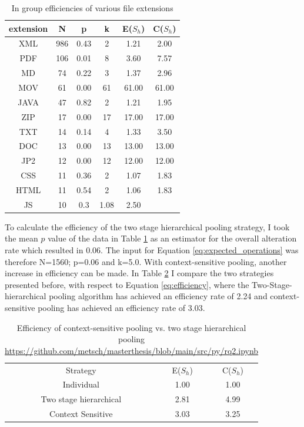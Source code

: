 \begin{table}[b]
    \caption{In group efficiencies of various file extensions}
    \centering
    \begin{tabular}{ c c c c c c}
    \label{tb:efficiency}
     extension & N & p & k & E($S_h$) & C($S_h$) \\
     \hline
     XML & 986 & 0.43 & 2 & 1.21  & 2.00 \\  
     \hline
     PDF &106 &0.01 & 8 &  3.60 & 7.57 \\
     \hline
     MD & 74 & 0.22  & 3 & 1.37 & 2.96 \\    
     \hline
     MOV&61 & 0.00 &  61 & 61.00 & 61.00 \\  
     \hline
     JAVA &47 &0.82 & 2  & 1.21 & 1.95 \\  
     \hline
     ZIP & 17 &0.00 &  17 & 17.00 & 17.00 \\
     \hline
     TXT & 14 & 0.14 &  4 & 1.33 & 3.50 \\ 
     \hline
     DOC & 13 & 0.00 &  13 & 13.00 & 13.00 \\   
     \hline
     JP2 & 12 & 0.00 &  12 & 12.00 & 12.00 \\   
     \hline
     CSS & 11 & 0.36 & 2  & 1.07 & 1.83 \\  
     \hline
     HTML & 11 & 0.54 &  2 & 1.06 & 1.83 \\   
     \hline
     JS & 10 & 0.3 & 1.08 & 2.50 
    \end{tabular}
\end{table}

To calculate the efficiency of the two stage hierarchical pooling strategy, I took the mean $p$ value of the data in Table \ref{tb:efficiency} as an estimator for the overall alteration rate which resulted in 0.06. The input for Equation \ref{eq:expected_operations} was therefore N=1560; p=0.06 and k=5.0.
With context-sensitive pooling, another increase in efficiency can be made. In Table \ref{tb:context-sensitive} I compare the two strategies presented before, with respect to Equation \ref{eq:efficiency}, where the Two-Stage-hierarchical pooling algorithm has achieved an efficiency rate of 2.24 and context-sensitive pooling has achieved an efficiency rate of 3.03. 
\begin{table}[b]
    \caption{Efficiency of context-sensitive pooling vs. two stage hierarchical pooling \url{https://github.com/metsch/masterthesis/blob/main/src/py/rq2.ipynb}}
    \centering
    \begin{tabular}{c c c}
    \label{tb:context-sensitive}
    Strategy & E($S_h$) & C($S_h$) \\
    Individual & 1.00 & 1.00 \\
    Two stage hierarchical &  2.81 & 4.99\\
    Context Sensitive & 3.03 & 3.25
    \end{tabular}
\end{table}

